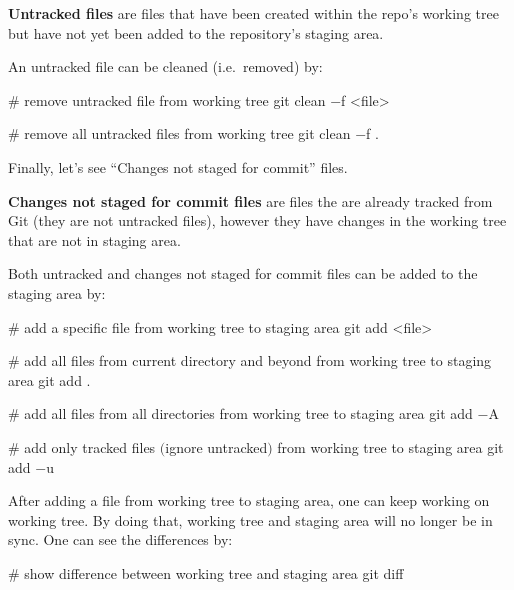 \textbf{Untracked files} are files that have been created within the repo's working tree but have not yet been added
to the repository's staging area.
\ed

An untracked file can be cleaned (i.e.\ removed) by:

\begin{bash}
# remove untracked file from working tree
git clean $-$f <file>
\end{bash}

\begin{bash}
# remove all untracked files from working tree
git clean $-$f .
\end{bash}

Finally, let's see ``Changes not staged for commit'' files.

\textbf{Changes not staged for commit files} are files the are already tracked from Git (they are not untracked
files), however they have changes in the working tree that are not in staging area.
\ed

Both untracked and changes not staged for commit files can be added to the staging area by:

\begin{bash}
# add a specific file from working tree to staging area
git add <file>
\end{bash}


\begin{bash}
# add all files from current directory and beyond from working tree to staging area
git add .
\end{bash}

\begin{bash}
# add all files from all directories from working tree to staging area
git add $-$A
\end{bash}

\begin{bash}
# add only tracked files $($ignore untracked$)$ from working tree to staging area
git add $-$u
\end{bash}

After adding a file from working tree to staging area, one can keep working on working tree. By doing that, working
tree and staging area will no longer be in sync. One can see the differences by:

\begin{bash}
# show difference between working tree and staging area
git diff
\end{bash}

